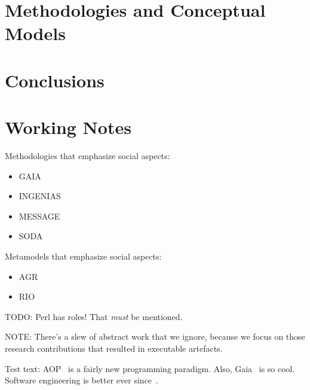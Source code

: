 \documentclass{article}
\begin{document}
\section{Methodologies and Conceptual Models}\label{sec:general_nonsense} %

\section{Conclusions}\label{sec:conclusions} %

\section{Working Notes} %
Methodologies that emphasize social aspects:
\begin{itemize}
\item GAIA~\cite{journals/aamas/WooldridgeJK00}
\item INGENIAS
\item MESSAGE
\item SODA
\end{itemize}
Metamodels that emphasize social aspects:
\begin{itemize}
\item AGR~\cite{conf/aose/FerberGM03}
\item RIO
\end{itemize}

TODO: Perl has roles! That \emph{must} be mentioned.

NOTE: There's a slew of abstract work that we ignore, because we focus on those research contributions that resulted in executable artefacts.

Test text:
AOP~\cite{journals/ai/Shoham93} is a fairly new programming paradigm.
Also, Gaia~\cite{journals/aamas/WooldridgeJK00} is so cool.
Software engineering is better ever since~\cite{conf/aose/WooldridgeC00}.



\end{document}
